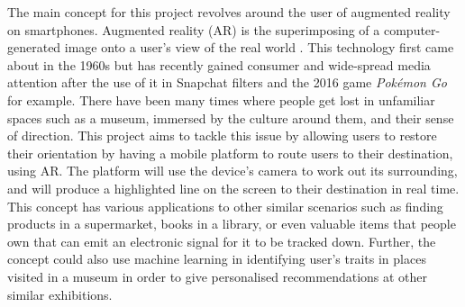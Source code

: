
The main concept for this project revolves around the user of augmented reality on smartphones. Augmented reality (AR) is the superimposing of a computer-generated image onto a user's view of the real world \cite{oxforddict}. This technology first came about in the 1960s \cite{InteractionDesign} but has recently gained consumer and wide-spread media attention after the use of it in Snapchat filters and the 2016 game \textit{Pokémon Go} for example. There have been many times where people get lost in unfamiliar spaces such as a museum, immersed by the culture around them, and their sense of direction. This project aims to tackle this issue by allowing users to restore their orientation by having a mobile platform to route users to their destination, using AR. The platform will use the device's camera to work out its surrounding, and will produce a highlighted line on the screen to their destination in real time.\\ 

This concept has various applications to other similar scenarios such as finding products in a supermarket, books in a library, or even valuable items that people own that can emit an electronic signal for it to be tracked down. Further, the concept could also use machine learning in identifying user's traits in places visited in a museum in order to give personalised recommendations at other similar exhibitions.